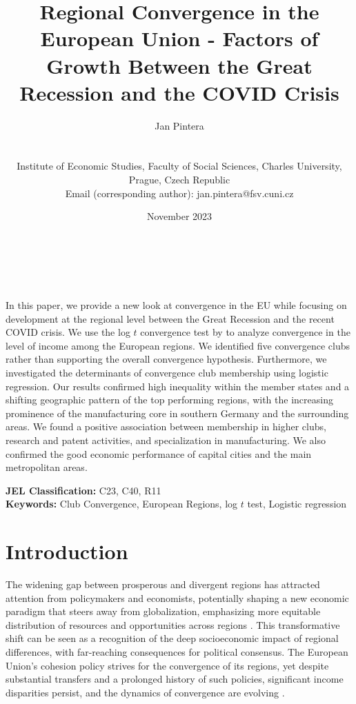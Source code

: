 \documentclass[11pt]{article}
\title{\large Regional Convergence in the European Union - Factors of Growth Between the Great Recession and the COVID Crisis}
\author{
        \begin{large}Jan Pintera\end{large} \\\vspace{5mm} \begin{small} Institute of Economic Studies, Faculty of Social Sciences, Charles University,\\ Prague, Czech Republic\\
        Email (corresponding author): jan.pintera@fsv.cuni.cz 
        \end{small}
}
\date{November 2023}
\makeatletter
\renewcommand{\maketitle}{\bgroup\setlength{\parindent}{0pt}
\begin{flushright}
  \textbf{\@title}\\
  \vspace{5mm}
  \@author\\
  \vspace{5mm}
  \@date
\end{flushright}\egroup
}
\renewenvironment{abstract}
 {\small
  \begin{flushleft}
  \bfseries \abstractname\vspace{-.5em}\vspace{0pt}
  \end{flushleft}
  \list{}{%
    \setlength{\leftmargin}{0mm}%
    \setlength{\rightmargin}{\leftmargin}%
  }%
  \item\relax}
 {\endlist}
\def \Keywords {Club Convergence, European Regions, log $t$ test, Logistic regression}
\makeatother
\begin{document}
\maketitle


\thispagestyle{empty}
\begin{abstract}
In this paper, we provide a new look at convergence in the EU while focusing on development at the regional level between the Great Recession and the recent COVID crisis. We use the log $t$ convergence test by \citet{phillips2007transition} to analyze convergence in the level of income among the European regions. We identified five convergence clubs rather than supporting the overall convergence hypothesis. Furthermore, we investigated the determinants of convergence club membership using logistic regression. Our results confirmed high inequality within the member states and a shifting geographic pattern of the top performing regions, with the increasing prominence of the manufacturing core in southern Germany and the surrounding areas. We found a positive association between membership in higher clubs, research and patent activities, and specialization in manufacturing. We also confirmed the good economic performance of capital cities and the main metropolitan areas.

\bigskip


\textbf{JEL Classification:} C23, C40, R11 \\
\textbf{Keywords:}  \Keywords \\

\bigskip

\end{abstract}
\clearpage
\setcounter{page}{1}

\section{Introduction}
The widening gap between prosperous and divergent regions has attracted attention from policymakers and economists, potentially shaping a new economic paradigm that steers away from globalization, emphasizing more equitable distribution of resources and opportunities across regions \citep{rodrik_2022}. This transformative shift can be seen as a recognition of the deep socioeconomic impact of regional differences, with far-reaching consequences for political consensus. The European Union's cohesion policy strives for the convergence of its regions, yet despite substantial transfers and a prolonged history of such policies, significant income disparities persist, and the dynamics of convergence are evolving \citep{eckey2007convergence,zarotiadis2013european, iammarino2019regional}.
\end{document}
